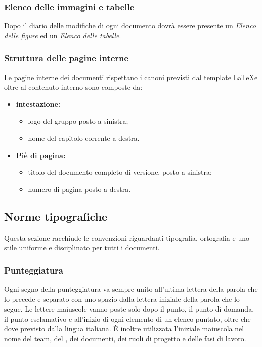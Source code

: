  \subsubsection{Elenco delle immagini e tabelle} 
Dopo il diario delle modifiche di ogni documento dovrà essere presente un \textit{Elenco delle figure} ed un \textit{Elenco delle tabelle}.

\subsubsection{Struttura delle pagine interne}
Le pagine interne dei documenti rispettano i canoni previsti dal template \LaTeX e oltre al contenuto interno sono composte da: \\

\begin{itemize}
	\item \textbf{intestazione:}
	\begin{itemize}
		\item logo del gruppo posto a sinistra;
		\item nome del capitolo corrente a destra. 
	\end{itemize}
	\item \textbf {Piè di pagina:}
	\begin{itemize}
	\item titolo del documento completo di versione, posto a sinistra;
	\item numero di pagina posto a destra.
	\end{itemize}

\end{itemize} 
\subsection{Norme tipografiche}
Questa sezione racchiude le convenzioni riguardanti tipografia, ortografia e uno stile uniforme e disciplinato per tutti i documenti.
\subsubsection{Punteggiatura}
Ogni segno della punteggiatura va sempre unito all'ultima lettera della parola che lo precede e separato con uno spazio dalla lettera iniziale della parola che lo segue.
Le lettere maiuscole vanno poste solo dopo il punto, il punto di domanda, il punto esclamativo e all’inizio di ogni elemento di un elenco puntato, oltre che dove previsto dalla lingua italiana. È inoltre utilizzata l’iniziale maiuscola nel nome del team, del , dei documenti, dei ruoli di progetto e delle fasi di lavoro.
